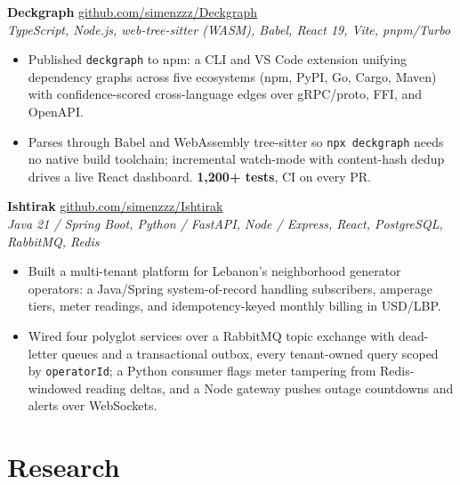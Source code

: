 \documentclass[11pt, a4paper]{article}
\begin{document}
\medskip

\textbf{Deckgraph} \hfill
  \href{https://github.com/simenzzz/Deckgraph}{github.com/simenzzz/Deckgraph} \\
\textit{TypeScript, Node.js, web-tree-sitter (WASM), Babel, React 19, Vite, pnpm/Turbo}
\begin{itemize}
  \item Published \texttt{deckgraph} to npm: a CLI and VS Code extension unifying
        dependency graphs across five ecosystems (npm, PyPI, Go, Cargo, Maven) with
        confidence-scored cross-language edges over gRPC/proto, FFI, and OpenAPI.
  \item Parses through Babel and WebAssembly tree-sitter so \texttt{npx deckgraph}
        needs no native build toolchain; incremental watch-mode with content-hash
        dedup drives a live React dashboard. \textbf{1{,}200+ tests}, CI on every PR.
\end{itemize}

\medskip

\textbf{Ishtirak} \hfill
  \href{https://github.com/simenzzz/Ishtirak}{github.com/simenzzz/Ishtirak} \\
\textit{Java 21 / Spring Boot, Python / FastAPI, Node / Express, React, PostgreSQL, RabbitMQ, Redis}
\begin{itemize}
  \item Built a multi-tenant platform for Lebanon's neighborhood generator operators:
        a Java/Spring system-of-record handling subscribers, amperage tiers, meter
        readings, and idempotency-keyed monthly billing in USD/LBP.
  \item Wired four polyglot services over a RabbitMQ topic exchange with dead-letter
        queues and a transactional outbox, every tenant-owned query scoped by
        \texttt{operatorId}; a Python consumer flags meter tampering from
        Redis-windowed reading deltas, and a Node gateway pushes outage
        countdowns and alerts over WebSockets.
\end{itemize}

\section{Research}
\end{document}
